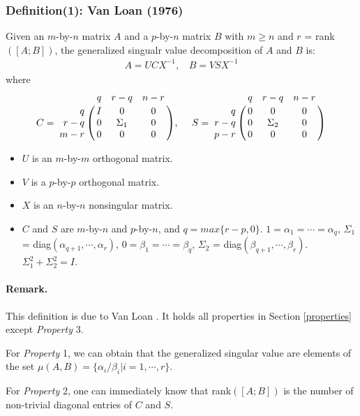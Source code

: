         \subsubsection{Definition(1): Van Loan (1976) \cite[pp.~309]{golub2013matrix}}
        
        Given an $m$-by-$n$ matrix $A$ and a $p$-by-$n$ matrix $B$ with $m \ge n$ and $r$ = rank$([A; B])$, the generalized singualr value decomposition of $A$ and $B$ is:
        \begin{align}
            A = UCX^{-1}, \ \   \ \ B = VSX^{-1}  
        \end{align}
        where
        \begin{displaymath}
            C = \bordermatrix{ & q & r-q & n-r  \cr
            \hfill q & I & 0 & 0\cr
            \hfill r-q & 0 & \Sigma_1 & 0\cr
            \hfill m-r & 0 & 0 & 0}, \  \ \ \
            S = \bordermatrix{ & q & r-q & n-r \cr
            \hfill q & 0 & 0 & 0\cr
            \hfill r-q & 0 & \Sigma_2 & 0\cr
            \hfill p-r & 0 & 0 & 0}
        \end{displaymath}
        
        \begin{itemize}
            \item $U$ is an $m$-by-$m$ orthogonal matrix.
            \item $V$ is a $p$-by-$p$ orthogonal matrix.
            \item $X$ is an $n$-by-$n$ nonsingular matrix. 
            \item $C$ and $S$ are $m$-by-$n$ and $p$-by-$n$, and $q = max\{r-p, 0\}$. $1 = \alpha_1 = \cdots = \alpha_q$, $\Sigma_1$ = diag$(\alpha_{q+1}, \cdots, \alpha_r)$, $0 = \beta_1 = \cdots = \beta_q$, $\Sigma_2$ = diag$(\beta_{q+1}, \cdots, \beta_r)$. $\Sigma_1^2 + \Sigma_2^2 = I$.
        \end{itemize}
        
        \paragraph{Remark.}
            This definition is due to Van Loan \cite{van1976generalizing}. It holds all properties in Section \ref{properties} except \textit{Property} 3.
            
            For \textit{Property} 1, we can obtain that the generalized singular value are elements of the set $\mu(A,B) = \{\alpha_i/\beta_i|i=1, \cdots, r\}$.
            
            For \textit{Property} 2, one can immediately know that rank$([A; B])$ is the number of non-trivial diagonal entries of $C$ and $S$.
            

